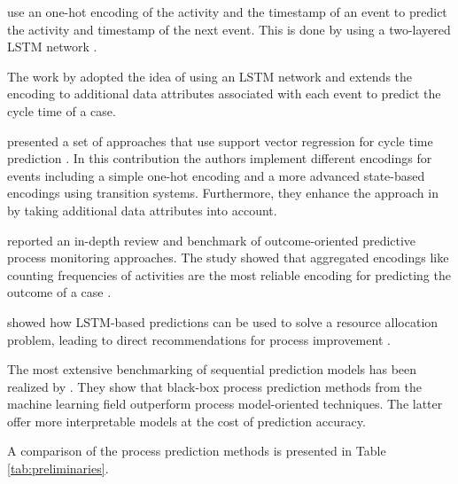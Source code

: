 \citeauthor{DBLP:conf/caise/TaxVRD17} use an one-hot encoding of the activity and the timestamp of an event to predict the activity and timestamp of the next event.
This is done by using a two-layered LSTM network \cite{DBLP:conf/caise/TaxVRD17}.

The work by \citeauthor{DBLP:conf/ssci/NavarinVPS17} adopted the idea of using an LSTM network \cite{DBLP:conf/caise/TaxVRD17} and extends the encoding to additional data attributes associated with each event \cite{DBLP:conf/ssci/NavarinVPS17} to predict the cycle time of a case.

\citeauthor{DBLP:journals/computing/PolatoSBL18} presented a set of approaches that use support vector regression for cycle time prediction  \cite{DBLP:journals/computing/PolatoSBL18}.
In this contribution the authors implement different encodings for events including a simple one-hot encoding and a more advanced state-based encodings using transition systems.
Furthermore, they enhance the approach in \cite{DBLP:journals/is/AalstSS11} by taking additional data attributes into account.

\citeauthor{DBLP:journals/tkdd/TeinemaaDRM19} reported an in-depth review and benchmark of outcome-oriented predictive process monitoring approaches.
The study showed that aggregated encodings like counting frequencies of activities are the most reliable encoding for predicting the outcome of a case \cite{DBLP:journals/tkdd/TeinemaaDRM19}.

\citeauthor{DBLP:conf/icpm/ParkS19} showed how LSTM-based predictions can be used to solve a resource allocation problem, leading to direct recommendations for process improvement \cite{DBLP:conf/icpm/ParkS19}.

The most extensive benchmarking of sequential prediction models has been realized by \citeauthor{DBLP:journals/sosym/TaxTZ20} \cite{DBLP:journals/sosym/TaxTZ20}.
They show that black-box process prediction methods from the machine learning field outperform process model-oriented techniques.
The latter offer more interpretable models at the cost of prediction accuracy.

A comparison of the process prediction methods is presented in Table \ref{tab:preliminaries}.

